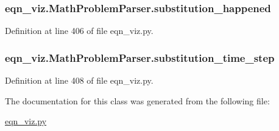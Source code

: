 \subsubsection[{substitution\+\_\+happened}]{\setlength{\rightskip}{0pt plus 5cm}eqn\+\_\+viz.\+Math\+Problem\+Parser.\+substitution\+\_\+happened}\label{classeqn__viz_1_1_math_problem_parser_a90141c1857b83a1bdfa5951453217204}


Definition at line 406 of file eqn\+\_\+viz.\+py.

\hypertarget{classeqn__viz_1_1_math_problem_parser_a6761399d080e0fd649cd5c2582590ccd}{}
\subsubsection[{substitution\+\_\+time\+\_\+step}]{\setlength{\rightskip}{0pt plus 5cm}eqn\+\_\+viz.\+Math\+Problem\+Parser.\+substitution\+\_\+time\+\_\+step}\label{classeqn__viz_1_1_math_problem_parser_a6761399d080e0fd649cd5c2582590ccd}


Definition at line 408 of file eqn\+\_\+viz.\+py.



The documentation for this class was generated from the following file\+:\begin{DoxyCompactItemize}
\item 
\hyperlink{eqn__viz_8py}{eqn\+\_\+viz.\+py}\end{DoxyCompactItemize}

